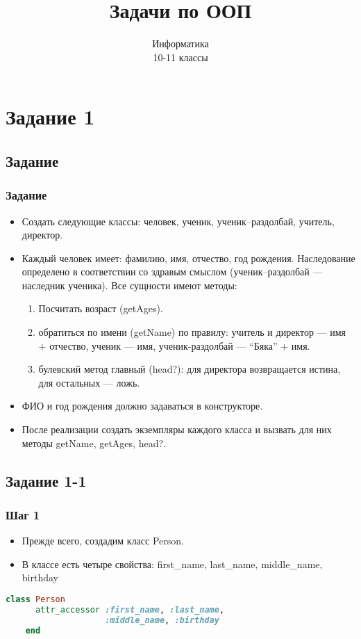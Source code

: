 \documentclass[compress,red]{beamer}
\title{Задачи по ООП}
\author{Информатика \\ 10-11 классы}
\begin{document}
\maketitle

\section{Задание 1}

\subsection{Задание}
\begin{frame}[fragile]
  \frametitle{Задание}
  \begin{itemize}
    \item Создать следующие классы: человек, ученик, ученик--раздолбай, учитель, директор. 
    \item Каждый человек имеет: фамилию, имя, отчество, год рождения. Наследование определено в соответствии со здравым смыслом (ученик--раздолбай --- наследник ученика). Все сущности имеют методы:
     \begin{enumerate}
      \item Посчитать возраст (getAges).
      \item обратиться по имени (getName) по правилу: учитель и директор --- имя + отчество, ученик --- имя, ученик-раздолбай --- ``Бяка'' + имя. 
      \item булевский метод главный (head?): для директора возвращается истина, для остальных --- ложь.
     \end{enumerate} 
    \item ФИО и год рождения должно задаваться в конструкторе.
    \item После реализации создать экземпляры каждого класса и вызвать для них методы getName, getAges, head?.
  \end{itemize}
\end{frame}

\subsection{Задание 1-1}
\begin{frame}[fragile]
  \frametitle{Шаг 1}
  \begin{itemize}
    \item Прежде всего, создадим класс Person.
    \item В классе есть четыре свойства: first\_name, last\_name, middle\_name, birthday
  \end{itemize}
  
  \scriptsize{
  \begin{lstlisting}[language=ruby,basicstyle=\footnotesize,label=ruby1,caption=Основа Person]
    class Person
      attr_accessor :first_name, :last_name,
                    :middle_name, :birthday
    end
  \end{lstlisting}
  }
\end{frame}
\end{document}
